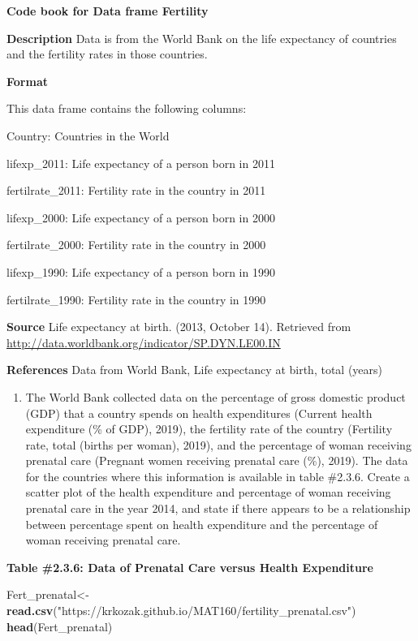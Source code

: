 \documentclass[
]{book}
\newenvironment{Shaded}{\begin{snugshade}}{\end{snugshade}}
\newcommand{\KeywordTok}[1]{\textcolor[rgb]{0.13,0.29,0.53}{\textbf{#1}}}
\newcommand{\NormalTok}[1]{#1}
\newcommand{\StringTok}[1]{\textcolor[rgb]{0.31,0.60,0.02}{#1}}
\providecommand{\tightlist}{%
  \setlength{\itemsep}{0pt}\setlength{\parskip}{0pt}}
\begin{document}
\textbf{Code book for Data frame Fertility}

\textbf{Description}
Data is from the World Bank on the life expectancy of countries and the fertility rates in those countries.

\textbf{Format}

This data frame contains the following columns:

Country: Countries in the World

lifexp\_2011: Life expectancy of a person born in 2011

fertilrate\_2011: Fertility rate in the country in 2011

lifexp\_2000: Life expectancy of a person born in 2000

fertilrate\_2000: Fertility rate in the country in 2000

lifexp\_1990: Life expectancy of a person born in 1990

fertilrate\_1990: Fertility rate in the country in 1990

\textbf{Source}
Life expectancy at birth. (2013, October 14). Retrieved from
\url{http://data.worldbank.org/indicator/SP.DYN.LE00.IN}

\textbf{References}
Data from World Bank, Life expectancy at birth, total (years)

\begin{enumerate}
\def\labelenumi{\arabic{enumi}.}
\setcounter{enumi}{3}
\tightlist
\item
  The World Bank collected data on the percentage of gross domestic product (GDP) that a country spends on health expenditures (Current health expenditure (\% of GDP), 2019), the fertility rate of the country (Fertility rate, total (births per woman), 2019), and the percentage of woman receiving prenatal care (Pregnant women receiving prenatal care (\%), 2019). The data for the countries where this information is available in table \#2.3.6. Create a scatter plot of the health expenditure and percentage of woman receiving prenatal care in the year 2014, and state if there appears to be a relationship between percentage spent on health expenditure and the percentage of woman receiving prenatal care.
\end{enumerate}

\textbf{Table \#2.3.6: Data of Prenatal Care versus Health Expenditure}

\begin{Shaded}
\begin{Highlighting}[]
\NormalTok{Fert_prenatal<-}\StringTok{ }\KeywordTok{read.csv}\NormalTok{(}\StringTok{"https://krkozak.github.io/MAT160/fertility_prenatal.csv"}\NormalTok{)}
\KeywordTok{head}\NormalTok{(Fert_prenatal)}
\end{Highlighting}
\end{Shaded}
\end{document}
